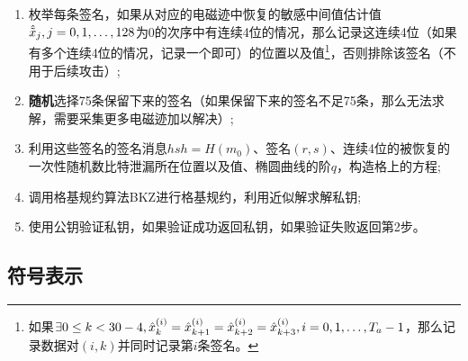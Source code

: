{	\begin{enumerate}
		\item 枚举每条签名，如果从对应的电磁迹中恢复的敏感中间值估计值$\hat{\tilde {x}}_j,j=0,1,\dots,128$为0的次序中有连续4位的情况，那么记录这连续4位（如果有多个连续4位的情况，记录一个即可）的位置以及值\footnote{如果$\exists 0\le k<30-4,\hat{x}^{(i)}_k=\hat{x}^{(i)}_{k+1}=\hat{x}^{(i)}_{k+2}=\hat{x}^{(i)}_{k+3},i=0,1,\dots,T_a-1$，那么记录数据对$(i,k)$并同时记录第$i$条签名。}，否则排除该签名（不用于后续攻击）;
		\item \textbf{随机}选择75条保留下来的签名（如果保留下来的签名不足75条，那么无法求解，需要采集更多电磁迹加以解决）;
		\item 利用这些签名的签名消息$hsh=H(m_0)$、签名$(r,s)$、连续4位的被恢复的一次性随机数比特泄漏所在位置以及值、椭圆曲线的阶$q$，构造格上的方程;
		\item 调用格基规约算法BKZ\citep{Schnorr91}进行格基规约，利用近似解求解私钥;
		\item 使用公钥验证私钥，如果验证成功返回私钥，如果验证失败返回第2步。
	\end{enumerate}

	\subsection{符号表示}\label{subs:ecdsasymbol}
	
}
